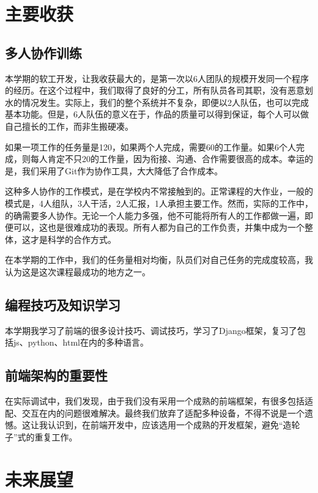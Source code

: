 \documentclass[a4paper,12pt]{article}
\begin{document}
    \section{主要收获} %
    \label{sec:主要收获}
    \subsection{多人协作训练} %
    \label{sub:多人协作训练}
    本学期的软工开发，让我收获最大的，是第一次以6人团队的规模开发同一个程序的经历。在这个过程中，我们取得了良好的分工，所有队员各司其职，没有恶意划水的情况发生。实际上，我们的整个系统并不复杂，即便以2人队伍，也可以完成基本功能。但是，6人队伍的意义在于，作品的质量可以得到保证，每个人可以做自己擅长的工作，而非生搬硬凑。

    如果一项工作的任务量是120，如果两个人完成，需要60的工作量。如果6个人完成，则每人肯定不只20的工作量，因为衔接、沟通、合作需要很高的成本。幸运的是，我们采用了Git作为协作工具，大大降低了合作成本。

    这种多人协作的工作模式，是在学校内不常接触到的。正常课程的大作业，一般的模式是，4人组队，3人干活，2人汇报，1人承担主要工作。然而，实际的工作中，的确需要多人协作。无论一个人能力多强，他不可能将所有人的工作都做一遍，即便可以，这也是很难成功的表现。所有人都为自己的工作负责，并集中成为一个整体，这才是科学的合作方式。

    在本学期的工作中，我们的任务量相对均衡，队员们对自己任务的完成度较高，我认为这是这次课程最成功的地方之一。
    \subsection{编程技巧及知识学习} %
    \label{sub:编程技巧及知识学习}
    本学期我学习了前端的很多设计技巧、调试技巧，学习了Django框架，复习了包括js、python、html在内的多种语言。
    \subsection{前端架构的重要性} %
    \label{sub:前端架构的重要性}
    在实际调试中，我们发现，由于我们没有采用一个成熟的前端框架，有很多包括适配、交互在内的问题很难解决。最终我们放弃了适配多种设备，不得不说是一个遗憾。这让我认识到，在前端开发中，应该选用一个成熟的开发框架，避免“造轮子”式的重复工作。
    \section{未来展望} %
    \label{sec:未来展望}
\end{document}
